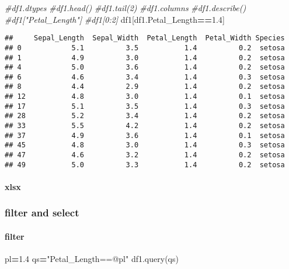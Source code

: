 \documentclass[
]{article}
\newenvironment{Shaded}{\begin{snugshade}}{\end{snugshade}}
\newcommand{\CommentTok}[1]{\textcolor[rgb]{0.56,0.35,0.01}{\textit{#1}}}
\newcommand{\FloatTok}[1]{\textcolor[rgb]{0.00,0.00,0.81}{#1}}
\newcommand{\NormalTok}[1]{#1}
\newcommand{\OperatorTok}[1]{\textcolor[rgb]{0.81,0.36,0.00}{\textbf{#1}}}
\newcommand{\StringTok}[1]{\textcolor[rgb]{0.31,0.60,0.02}{#1}}
\begin{document}
\begin{Shaded}
\begin{Highlighting}[]
\CommentTok{\#df1.dtypes}
\CommentTok{\#df1.head()}
\CommentTok{\#df1.tail(2)}
\CommentTok{\#df1.columns}
\CommentTok{\#df1.describe()}
\CommentTok{\#df1["Petal\_Length"]}
\CommentTok{\#df1[0:2]}
\NormalTok{df1[df1.Petal\_Length}\OperatorTok{==}\FloatTok{1.4}\NormalTok{]}
\end{Highlighting}
\end{Shaded}

\begin{verbatim}
##     Sepal_Length  Sepal_Width  Petal_Length  Petal_Width Species
## 0            5.1          3.5           1.4          0.2  setosa
## 1            4.9          3.0           1.4          0.2  setosa
## 4            5.0          3.6           1.4          0.2  setosa
## 6            4.6          3.4           1.4          0.3  setosa
## 8            4.4          2.9           1.4          0.2  setosa
## 12           4.8          3.0           1.4          0.1  setosa
## 17           5.1          3.5           1.4          0.3  setosa
## 28           5.2          3.4           1.4          0.2  setosa
## 33           5.5          4.2           1.4          0.2  setosa
## 37           4.9          3.6           1.4          0.1  setosa
## 45           4.8          3.0           1.4          0.3  setosa
## 47           4.6          3.2           1.4          0.2  setosa
## 49           5.0          3.3           1.4          0.2  setosa
\end{verbatim}

\hypertarget{xlsx}{%
\paragraph{\texorpdfstring{{ xlsx }}{ xlsx }}\label{xlsx}}

\hypertarget{filter-and-select}{%
\subsubsection{filter and select}\label{filter-and-select}}

\hypertarget{filter}{%
\paragraph{\texorpdfstring{{ filter }}{ filter }}\label{filter}}

\begin{Shaded}
\begin{Highlighting}[]
\NormalTok{pl}\OperatorTok{=}\FloatTok{1.4}
\NormalTok{qs}\OperatorTok{=}\StringTok{"Petal\_Length==@pl"}
\NormalTok{df1.query(qs)}
\end{Highlighting}
\end{Shaded}
\end{document}
